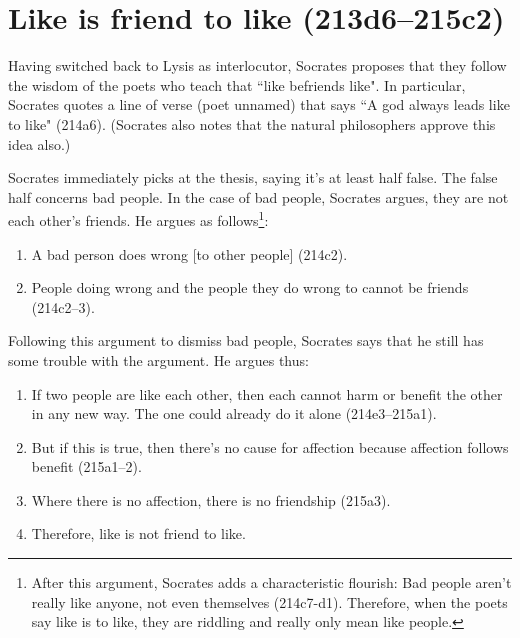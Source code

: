 \documentclass[11pt]{article}
\begin{document}

\section{Like is friend to like (213d6--215c2)}

Having switched back to Lysis as interlocutor, Socrates proposes that they
follow the wisdom of the poets who teach that ``like befriends like".  In
particular, Socrates quotes a line of verse (poet unnamed) that says ``A
god always leads like to like" (214a6).  (Socrates also notes that the
natural philosophers approve this idea also.)

Socrates immediately picks at the thesis, saying it's at least half false.
The false half concerns bad people.  In the case of bad people, Socrates
argues, they are not each other's friends.  He argues as follows\footnote
{After this argument, Socrates adds a characteristic flourish: Bad people
aren't really like anyone, not even themselves (214c7-d1).  Therefore, when
the poets say like is to like, they are riddling and really only mean
 like people.}:

\begin{enumerate}

    \item A bad person does wrong [to other people] (214c2).

    \item People doing wrong and the people they do wrong to cannot be
        friends (214c2--3).

\end{enumerate}

Following this argument to dismiss bad people, Socrates says that he still
has some trouble with the argument.  He argues thus:

\begin{enumerate}

    \item If two people are like each other, then each cannot harm or
        benefit the other in any new way.  The one could already do it
        alone (214e3--215a1).

    \item But if this is true, then there's no cause for affection because
        affection follows benefit (215a1--2).

    \item Where there is no affection, there is no friendship (215a3).

    \item Therefore, like is not friend to like.

\end{enumerate}
\end{document}
